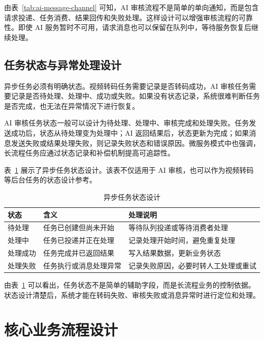 由表~\ref{tab:ai-message-channel} 可知，AI 审核流程不是简单的单向通知，而是包含请求投递、任务消费、结果回传和失败处理。这样设计可以增强审核流程的可靠性。即使 AI 服务暂时不可用，请求消息也可以保留在队列中，等待服务恢复后继续处理。

\subsection{任务状态与异常处理设计}
\label{subsec:task-status-exception-design}

异步任务必须有明确状态。视频转码任务需要记录是否转码成功，AI 审核任务需要记录是否待处理、处理中、成功或失败。如果没有状态记录，系统很难判断任务是否完成，也无法在异常情况下进行恢复。

AI 审核任务状态一般可以设计为待处理、处理中、审核完成和处理失败。任务发送成功后，状态从待处理变为处理中；AI 返回结果后，状态更新为完成；如果消息发送失败或结果处理失败，则记录失败状态和错误原因。微服务模式中也强调，长流程任务应通过状态记录和补偿机制提高可追踪性\cite{richardson2018microservices}。

表~\ref{tab:task-status-design} 展示了异步任务状态设计。该表不仅适用于 AI 审核，也可以作为视频转码等后台任务的状态设计参考。

\begin{table}[htbp]
  \centering
  \caption{异步任务状态设计}
  \label{tab:task-status-design}
  \begin{tabular}{p{}p{}p{}}
    \hline
    \textbf{状态} & \textbf{含义} & \textbf{处理说明} \\
    \hline
    待处理 & 任务已创建但尚未开始 & 等待队列投递或等待消费者处理 \\
    处理中 & 任务已投递并正在处理 & 记录处理开始时间，避免重复处理 \\
    处理成功 & 任务完成并已返回结果 & 写入结果数据，更新业务状态 \\
    处理失败 & 任务执行或消息处理异常 & 记录失败原因，必要时转人工处理或重试 \\
    \hline
  \end{tabular}
\end{table}

由表~\ref{tab:task-status-design} 可以看出，任务状态不是简单的辅助字段，而是长流程业务的控制依据。状态设计清楚后，系统才能在转码失败、审核失败或消息异常时进行定位和处理。

\section{核心业务流程设计}
\label{sec:core-business-process-design}

